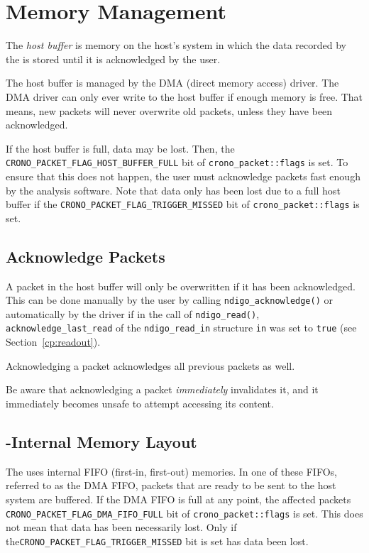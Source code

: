 \section{Memory Management}

The \textit{host buffer} is memory on the host's system in which the data recorded by the \deviceName{} is stored until it is acknowledged by the user.

The host buffer is managed by the DMA (direct memory access) driver. The DMA driver can only ever write to the host buffer if enough memory is free. That means, new packets will never overwrite old packets, unless they have been acknowledged.

If the host buffer is full, data may be lost. Then, the \texttt{CRONO\_PACKET\_FLAG\_HOST\_BUFFER\_FULL} bit of \texttt{crono\_packet::flags} is set. To ensure that this does not happen, the user must acknowledge packets fast enough by the analysis software. Note that data only has been lost due to a full host buffer if the \texttt{CRONO\_PACKET\_FLAG\_TRIGGER\_MISSED} bit of \texttt{crono\_packet::flags} is set.

\subsection{Acknowledge Packets}
A packet in the host buffer will only be overwritten if it has been acknowledged. This can be done manually by the user by calling \texttt{ndigo\_acknowledge()} or automatically by the driver if in the call of \texttt{ndigo\_read()}, \texttt{acknowledge\_last\_read} of the \texttt{ndigo\_read\_in} structure \texttt{in} was set to \texttt{true} (see Section~\ref{cp:readout}).

Acknowledging a packet acknowledges all previous packets as well.

Be aware that acknowledging a packet \textit{immediately} invalidates it, and it immediately becomes unsafe to attempt accessing its content.

\subsection{\deviceName-Internal Memory Layout}
The \deviceName{} uses internal FIFO (first-in, first-out) memories. In one of these FIFOs, referred to as the DMA FIFO, packets that are ready to be sent to the host system are buffered. If the DMA FIFO is full at any point, the affected packets \texttt{CRONO\_PACKET\_FLAG\_DMA\_FIFO\_FULL} bit of \texttt{crono\_packet::flags} is set. This does not mean that data has been necessarily lost. Only if the\newline\texttt{CRONO\_PACKET\_FLAG\_TRIGGER\_MISSED} bit is set has data been lost.